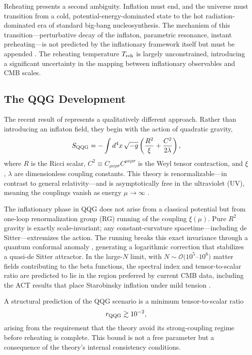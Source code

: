 \documentclass[12pt, a4paper]{article}
\newcommand{\rQQG}{r_{\rm QQG}}
\begin{document}
Reheating presents a second ambiguity. Inflation must end, and the universe must
transition from a cold, potential-energy-dominated state to the hot radiation-
dominated era of standard big-bang nucleosynthesis. The mechanism of this
transition---perturbative decay of the inflaton, parametric resonance, instant
preheating---is not predicted by the inflationary framework itself but must be
appended \citep{Kofman1997}. The reheating temperature $T_{\rm reh}$ is largely
unconstrained, introducing a significant uncertainty in the mapping between
inflationary observables and CMB scales.

\subsection{The QQG Development}

The recent result of \citet{Liu2026} represents a qualitatively different approach.
Rather than introducing an inflaton field, they begin with the action of quadratic
gravity,
\begin{equation}
S_{\rm QQG} = -\int d^4x\,\sqrt{-g}\left(\frac{R^2}{\xi} + \frac{C^2}{2\lambda}\right),
\end{equation}
where $R$ is the Ricci scalar, $C^2 \equiv C_{\mu\nu\rho\sigma}C^{\mu\nu\rho\sigma}$
is the Weyl tensor contraction, and $\xi$, $\lambda$ are dimensionless coupling
constants. This theory is renormalizable---in contrast to general relativity---and
is asymptotically free in the ultraviolet (UV), meaning the couplings vanish as
energy $\mu \to \infty$ \citep{Fradkin1982, Avramidi1985}.

The inflationary phase in QQG does not arise from a classical potential but from
one-loop renormalization group (RG) running of the coupling $\xi(\mu)$. Pure $R^2$
gravity is exactly scale-invariant; any constant-curvature spacetime---including de
Sitter---extremizes the action. The running breaks this exact invariance through a
quantum conformal anomaly \citep{Capper1974}, generating a logarithmic correction
that stabilizes a quasi-de Sitter attractor. In the large-$N$ limit, with $N \sim
\mathcal{O}(10^5$--$10^6)$ matter fields contributing to the beta functions, the
spectral index and tensor-to-scalar ratio are predicted to lie in the region
preferred by current CMB data, including the ACT results that place Starobinsky
inflation under mild tension \citep{Louis2025}.

A structural prediction of the QQG scenario is a minimum tensor-to-scalar ratio
\begin{equation}
\rQQG \gtrsim 10^{-2},
\end{equation}
arising from the requirement that the theory avoid its strong-coupling regime before
reheating is complete. This bound is not a free parameter but a consequence of the
theory's internal consistency conditions.
\end{document}
